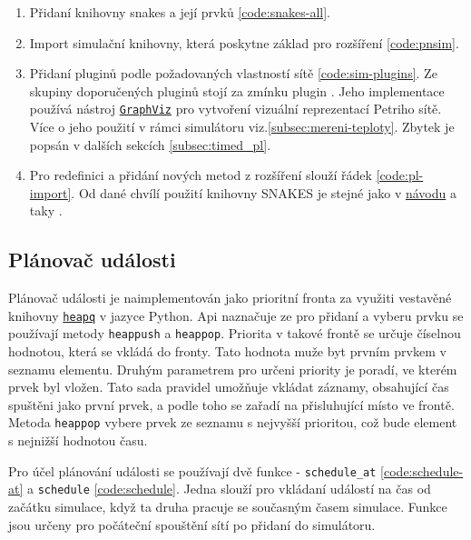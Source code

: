 \begin{enumerate}
  \item Přidaní knihovny snakes a její prvků \ref{code:snakes-all}.
  \item Import simulační knihovny, která poskytne základ pro rozšíření \ref{code:pnsim}.
  \item Přidaní pluginů podle požadovaných vlastností sítě \ref{code:sim-plugins}. Ze skupiny doporučených pluginů stojí za zmínku plugin \href{https://www.ibisc.univ-evry.fr/~fpommereau/SNAKES/API/plugins/gv.html}{}. Jeho implementace používá nástroj \href{https://www.graphviz.org/}{\texttt{GraphViz}} pro vytvoření vizuální reprezentací Petriho sítě. Více o jeho použití v rámci simulátoru viz.\ref{subsec:mereni-teploty}. Zbytek je popsán v dalších sekcích \ref{subsec:timed_pl}.
  \item Pro redefinici a přidání nových metod z rozšíření slouží řádek \ref{code:pl-import}. Od dané chvílí použití knihovny SNAKES je stejné jako v \href{https://www.ibisc.univ-evry.fr/~fpommereau/SNAKES/first-steps-with-snakes.html}{návodu} a taky .
\end{enumerate}


\subsection{Plánovač události}
\label{subsec:event-planner}
Plánovač události je naimplementován jako prioritní fronta za využiti vestavěné knihovny \href{https://docs.python.org/3/library/heapq.html}{\texttt{heapq}} v jazyce Python. Api naznačuje ze pro přidaní a vyberu prvku se používají metody \texttt{heappush} a \texttt{heappop}. Priorita v takové frontě se určuje číselnou hodnotou, která se vkládá do fronty. Tato hodnota muže byt prvním prvkem v seznamu elementu. Druhým parametrem pro určeni priority je poradí, ve kterém prvek byl vložen. Tato sada pravidel umožňuje vkládat záznamy, obsahující čas spuštěni jako první prvek, a podle toho se zařadí na přisluhující místo ve frontě. Metoda \texttt{heappop} vybere prvek ze seznamu s nejvyšší prioritou, což bude element s nejnižší hodnotou času.

Pro účel plánování události se používají dvě funkce - \texttt{schedule\_at} \ref{code:schedule-at} a \texttt{schedule} \ref{code:schedule}. Jedna slouží pro vkládaní událostí na čas od začátku simulace, když ta druha pracuje se současným časem simulace. Funkce jsou určeny pro počáteční spouštění sítí po přidaní do simulátoru.

